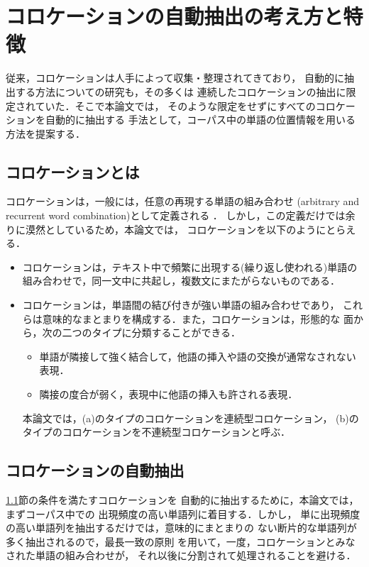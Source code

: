 \section{コロケーションの自動抽出の考え方と特徴}
\label{Sec:extract_abstract}

従来，コロケーションは人手によって収集・整理されてきており，
自動的に抽出する方法についての研究も，その多くは
連続したコロケーションの抽出に限定されていた．そこで本論文では，
そのような限定をせずにすべてのコロケーションを自動的に抽出する
手法として，コーパス中の単語の位置情報を用いる方法を提案する．

\subsection{コロケーションとは}
\label{Subsec:def_collocation}

コロケーションは，一般には，任意の再現する単語の組み合わせ
(arbitrary and recurrent word combination)として定義される
\cite{Benson90,Benson86,Smadja93}．
しかし，この定義だけでは余りに漠然としているため，本論文では，
コロケーションを以下のようにとらえる．
\begin{itemize}
\item[1.] コロケーションは，テキスト中で頻繁に出現する(繰り返し使われる)単語の
組み合わせで，同一文中に共起し，複数文にまたがらないものである．
\item[2.] コロケーションは，単語間の結び付きが強い単語の組み合わせであり，
これらは意味的なまとまりを構成する．また，コロケーションは，形態的な
面から，次の二つのタイプに分類することができる\cite{Abe97}．
\begin{itemize}
\item[(a)] 単語が隣接して強く結合して，他語の挿入や語の交換が通常なされない
表現．
\item[(b)] 隣接の度合が弱く，表現中に他語の挿入も許される表現．
\end{itemize}
本論文では，(a)のタイプのコロケーションを連続型コロケーション，
(b)のタイプのコロケーションを不連続型コロケーションと呼ぶ．
\end{itemize}

\subsection{コロケーションの自動抽出}
\label{Subsec:auto_extract}

\ref{Subsec:def_collocation}節の条件を満たすコロケーションを
自動的に抽出するために，本論文では，まずコーパス中での
出現頻度の高い単語列に着目する．しかし，
単に出現頻度の高い単語列を抽出するだけでは，意味的にまとまりの
ない断片的な単語列が多く抽出されるので，最長一致の原則\cite{Ikehara95}
を用いて，一度，コロケーションとみなされた単語の組み合わせが，
それ以後に分割されて処理されることを避ける．

